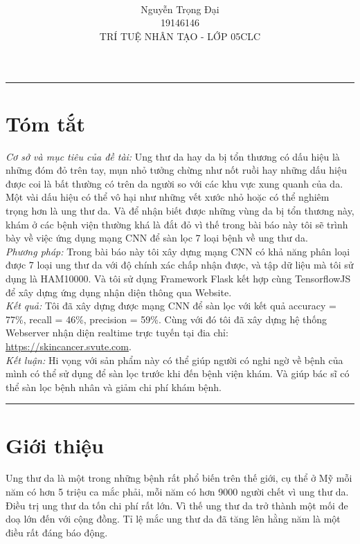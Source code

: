 \documentclass[12pt,a4paper]{article}
\title{
	\centering\normalsize  
	\vspace{-0.7in}
	\colorbox{black}{\parbox{\linewidth}{\textcolor{white}{\hfill\HCMUTE \hfill}}} \\[0.5ex]
	\begin{minipage}{\dimexpr0.5\linewidth-0.5\wlogo}\oriart\end{minipage}%
	\begin{minipage}{\dimexpr0.5\linewidth+0.5\wlogo-6pt}\LOGO \end{minipage}\\[0.5ex]
	\colorbox{black}{\parbox{\linewidth}{\textcolor{white}{\hfill\KHCMUTE\hfill}}}\\[1ex]
	\titleofArt
}
\author{Nguyễn Trọng Đại\\19146146\\TRÍ TUỆ NHÂN TẠO - LỚP 05CLC}
\date{}
\begin{document}
	\maketitle
	\thispagestyle{Initial}
	\noindent
	\rule{\textwidth}{0.4pt}
	
	\section*{Tóm tắt}
	
	\textit{Cơ sở và mục tiêu của đề tài:} Ung thư da hay da bị tổn thương có dấu hiệu là những đóm đỏ trên tay, mụn nhỏ tưởng chừng như nốt ruồi hay những dấu hiệu được coi là bất thường có trên da người so với các khu vực xung quanh của da. Một vài dấu hiệu có thể vô hại như những vết xước nhỏ hoặc có thể nghiêm trọng hơn là ung thư da. Và để nhận biết được những vùng da bị tổn thương này, khám ở các bệnh viện thường khá là đắt đỏ vì thế trong bài báo này tôi sẽ trình bày về việc ứng dụng mạng CNN để sàn lọc 7 loại bệnh về ung thư da.\\
	
	\noindent
	\textit{Phương pháp:} Trong bài báo này tôi xây dựng mạng CNN có khả năng phân loại được 7 loại ung thư da với độ chính xác chấp nhận được, và tập dữ liệu mà tôi sử dụng là HAM10000. Và tôi sử dụng Framework Flask kết hợp cùng TensorflowJS để xây dựng ứng dụng nhận diện thông qua Website.\\
	
	\noindent
	\textit{Kết quả:} Tôi đã xây dựng được mạng CNN để sàn lọc với kết quả accuracy = 77\%, recall = 46\%, precision = 59\%. Cùng với đó tôi đã xây dựng hệ thống Webserver nhận diện realtime trực tuyến tại đia chỉ: \href{https://skincancer.svute.com}{https://skincancer.svute.com}.\\
	
	\noindent
	\textit{Kết luận:} Hi vọng với sản phẩm này có thể giúp người có nghi ngờ về bệnh của mình có thể sử dụng để sàn lọc trước khi đến bệnh viện khám. Và giúp bác sĩ có thể sàn lọc bệnh nhân và giảm chi phí khám bệnh.
	
	\hfill \break
	\noindent
	\rule{\textwidth}{0.4pt}
	
	\section{Giới thiệu}
	Ung thư da là một trong những bệnh rất phổ biến trên thế giới, cụ thể ở Mỹ mỗi năm có hơn 5 triệu ca mắc phải, mỗi năm có hơn 9000 người chết vì ung thư da. Điều trị ung thư da tốn chi phí rất lớn. Vì thế ung thư da trở thành một mối đe doạ lớn đến với cộng đồng. Tỉ lệ mắc ung thư da đã tăng lên hằng năm là một điều rất đáng báo động.\\
	
\end{document}
